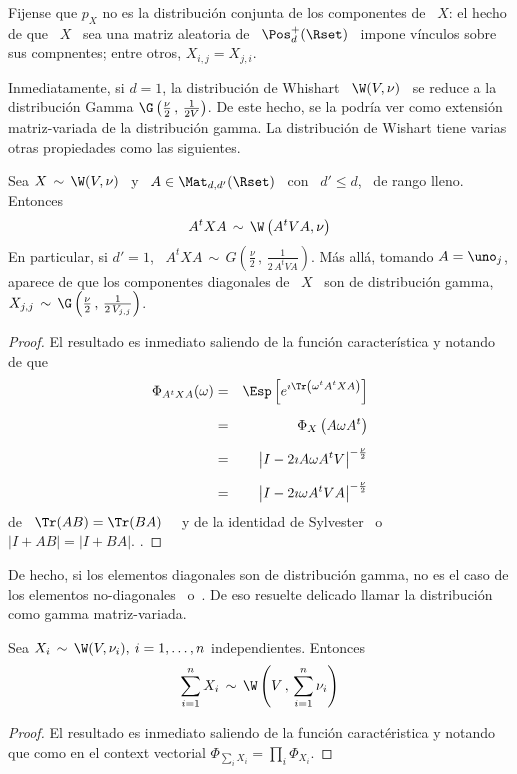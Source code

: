 Fijense que $p_X$ no es la  distribuci\'on conjunta de los componentes de \ $X$:
el hecho de que \ $X$ \ sea una matriz aleatoria de \ $\Pos_d^+(\Rset)$ \ impone
v\'inculos sobre sus compnentes; entre otros, $X_{i,j} = X_{j,i}$.

Inmediatamente, si  $d = 1$, la  distribuci\'on de Whishart \  $\W(V,\nu)$ \ se
reduce  a la  distribuci\'on Gamma  $\G\left(\frac{\nu}{2} \,  , \,  \frac1{2 V}
\right)$. De este  hecho, se la podr\'ia ver  como extensi\'on matriz-variada de
la  distribuci\'on  gamma.  La  distribuci\'on  de  Wishart  tiene varias  otras
propiedades como las siguientes.
%
\begin{lema}
\label{Lem:MP:StabilidadWishartLineal}
%
Sea $X \, \sim \, \W(V,\nu)$ \ y  \ $A \in \Mat_{d,d'}(\Rset)$ \ con \ $d' \le d$,
\ de rango lleno. Entonces
  \[
  A^t X A \, \sim \, \W\left( A^t V A , \nu \right)
  \]
  En particular, si $d'  = 1$, \ $A^t X A \, \sim  \, G\left( \frac{\nu}{2} \, ,
    \, \frac1{2 \, A^t V A} \right)$. M\'as all\'a, tomando $A = \uno_j$, aparece
  de que  los componentes diagonales de \  $X$ \ son de  distribuci\'on gamma, \
  $X_{j,j}  \, \sim  \,  \G\left( \frac{\nu}{2}  \,  , \,  \frac1{2 \,  V_{j,j}}
  \right)$.
\end{lema}
%
\begin{proof}
  El resultado es inmediato saliendo  de la funci\'on caracter\'istica y notando
  de que
%
\begin{eqnarray*}
\Phi_{A^t X A}(\omega) & = & \Esp\left[ e^{\imath \Tr\left( \omega^t A^t X A
\right)}\right]\\[2mm]
%
& = & \Phi_X\left( A \omega A^t\right)\\[2mm]
%
& = &  \left| I - 2 \imath A \omega A^t V \right|^{-\frac{\nu}{2}}\\[2mm]
%
& = &  \left| I - 2 \imath \omega A^t V A \right|^{-\frac{\nu}{2}}
%
\end{eqnarray*}
%
de   \   $\Tr(AB)   =   \Tr(BA)$~\cite{Har08}   \   y   de   la   identidad   de
Sylvester~\cite{Syl51,  AkrAkr96}  o~\cite[\S~18.1]{Har08} \  $\left|  I  + A  B
\right| = \left| I + B A \right|$.  .
\end{proof}
%
De hecho, si los elementos diagonales son de distribuci\'on gamma, no es el caso
de         los        elementos         no-diagonales~\cite{Seb04,        And03}
o~\cite[Teo.~3.3.4]{GupNag99}.    De    eso   resuelte   delicado    llamar   la
distribuci\'on como gamma matriz-variada.

\begin{lema}
\label{Lem:MP:StabilidadWishartSuma}
%
  Sea $X_i \,  \sim \, \W(V,\nu_i), \: i = 1,\ldots,n$ independientes. Entonces
  \[
  \sum_{i=1}^n X_i \, \sim \, \W\left( V \, , \, \sum_{i=1}^n \nu_i \right)
  \]
\end{lema}
%
\begin{proof}
  El resultado es inmediato saliendo  de la funci\'on caract\'eristica y notando
  que como en el context vectorial $\Phi_{\sum_i X_i} = \prod_i \Phi_{X_i}$.
\end{proof}

